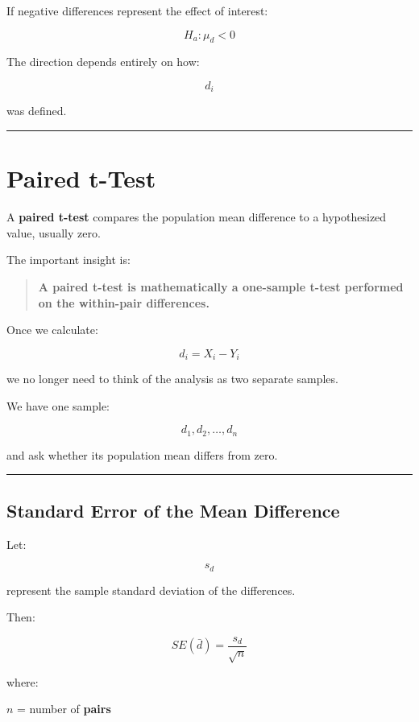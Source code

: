 \documentclass[
  letterpaper,
  DIV=11,
  numbers=noendperiod]{scrreprt}
\begin{document}
If negative differences represent the effect of interest:

\[
H_a:\mu_d<0
\]

The direction depends entirely on how:

\[
d_i
\]

was defined.

\begin{center}\rule{0.5\linewidth}{0.5pt}\end{center}


\chapter{Paired t-Test}\label{paired-t-test}

A \textbf{paired t-test} compares the population mean difference to a
hypothesized value, usually zero.

The important insight is:

\begin{quote}
\textbf{A paired t-test is mathematically a one-sample t-test performed
on the within-pair differences.}
\end{quote}

Once we calculate:

\[
d_i=X_i-Y_i
\]

we no longer need to think of the analysis as two separate samples.

We have one sample:

\[
d_1,d_2,\ldots,d_n
\]

and ask whether its population mean differs from zero.

\begin{center}\rule{0.5\linewidth}{0.5pt}\end{center}

\section{Standard Error of the Mean
Difference}\label{standard-error-of-the-mean-difference}

Let:

\[
s_d
\]

represent the sample standard deviation of the differences.

Then:

\[
SE(\bar{d})
=
\frac{s_d}{\sqrt{n}}
\]

where:

\(n\) = number of \textbf{pairs}
\end{document}
